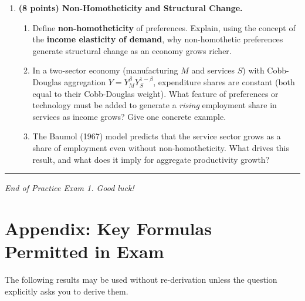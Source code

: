 \documentclass[a4paper,11pt]{article}
\begin{document}
\begin{enumerate}[label=\textbf{\arabic*.}, leftmargin=*, itemsep=14pt]
\begin{enumerate}[label=(\alph*), itemsep=6pt]
        \item What is the key criticism of the Jones fix from a theoretical standpoint?
    \end{enumerate}

    \item \textbf{(8 points) Non-Homotheticity and Structural Change.}

    \begin{enumerate}[label=(\alph*), itemsep=6pt]
        \item Define \textbf{non-homotheticity} of preferences.  Explain, using the concept
        of the \textbf{income elasticity of demand}, why non-homothetic preferences
        generate structural change as an economy grows richer.

        \item In a two-sector economy (manufacturing $M$ and services $S$) with
        Cobb-Douglas aggregation $Y = Y_M^{\beta}Y_S^{1-\beta}$, expenditure shares are
        constant (both equal to their Cobb-Douglas weight).  What feature of preferences or
        technology must be added to generate a \emph{rising} employment share in services
        as income grows?  Give one concrete example.

        \item The Baumol (1967) model predicts that the service sector grows as a share of
        employment even without non-homotheticity.  What drives this result, and what does
        it imply for aggregate productivity growth?
    \end{enumerate}

\end{enumerate}

\vspace{20pt}
\noindent\rule{\textwidth}{0.4pt}

\begin{center}
    \textit{End of Practice Exam 1. Good luck!}
\end{center}

\clearpage
\appendix
\section*{Appendix: Key Formulas Permitted in Exam}

The following results may be used without re-derivation unless the question explicitly asks
you to derive them.
\end{document}
